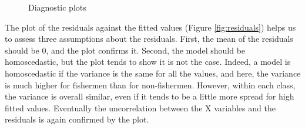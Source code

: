 \documentclass[12pt,]{article}
\begin{document}
\begin{figure}[htbp]

{\centering {}

}

\caption{Diagnostic plots}\label{fig:unnamed-chunk-18}
\end{figure}

The plot of the residuals against the fitted values (Figure
\ref{fig:residuals}) helps us to assess three assumptions about the
residuals. First, the mean of the residuals should be 0, and the plot
confirms it. Second, the model should be homoscedastic, but the plot
tends to show it is not the case. Indeed, a model is homoscedastic if
the variance is the same for all the values, and here, the variance is
much higher for fishermen than for non-fishermen. However, within each
class, the variance is overall similar, even if it tends to be a little
more spread for high fitted values. Eventually the uncorrelation between
the X variables and the residuals is again confirmed by the plot.
\end{document}
